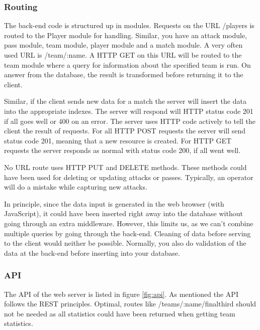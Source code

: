 \subsubsection{Routing}

The back-end code is structured up in modules. Requests on the URL /players is routed to the Player module for handling. Similar, you have an attack module, pass module, team module, player module and a match module. A very often used URL is /team/:name. A \ac{HTTP} GET on this URL will be routed to the team module where a query for information about the specified team is run. On answer from the database, the result is transformed before returning it to the client. 

Similar, if the client sends new data for a match the server will insert the data into the appropriate indexes. The server will respond will HTTP status code 201 if all goes well or 400 on an error. The server uses \ac{HTTP} code actively to tell the client the result of requests. For all \ac{HTTP} POST requests the server will send status code 201, meaning that a new resource is created. For \ac{HTTP} GET requests the server responds as normal with status code 200, if all went well. 

No URL route uses \ac{HTTP} PUT and DELETE methods. These methods could have been used for deleting or updating attacks or passes. Typically, an operator will do a mistake while capturing new attacks. 

In principle, since the data input is generated in the web browser (with JavaScript), it could have been inserted right away into the database without going through an extra middleware. However, this limits us, as we can’t combine multiple queries by going through the back-end. Cleaning of data before serving to the client would neither be possible. Normally, you also do validation of the data at the back-end before inserting into your database.

\subsubsection{API}

The \ac{API} of the web server is listed in figure \ref{fig:api}. As mentioned the \ac{API} follows the \ac{REST} principles. Optimal, routes like /teams/:name/finalthird should not be needed as all statistics could have been returned when getting team statistics. 

